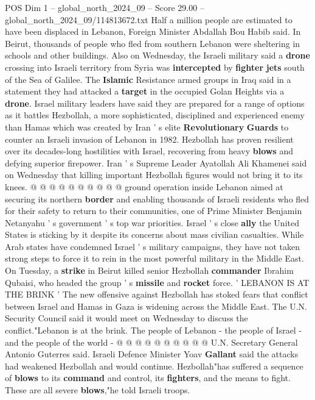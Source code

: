 \begin{textsample}{POS Dim 1 – global\_north\_2024\_09 – Score 29.00 – global\_north\_2024\_09/114813672.txt}
Half a million people are estimated to have been displaced in Lebanon, Foreign Minister Abdallah Bou Habib said.
In Beirut, thousands of people who fled from southern Lebanon were sheltering in schools and other buildings.
Also on Wednesday, the Israeli military said a \textbf{drone} crossing into Israeli territory from Syria was \textbf{intercepted} by \textbf{fighter} \textbf{jets} south of the Sea of Galilee.
The \textbf{Islamic} Resistance armed groups in Iraq said in a statement they had attacked a \textbf{target} in the occupied Golan Heights via a \textbf{drone}.
Israel military leaders have said they are prepared for a range of options as it battles Hezbollah, a more sophisticated, disciplined and experienced enemy than Hamas which was created by Iran ' s elite \textbf{Revolutionary} \textbf{Guards} to counter an Israeli invasion of Lebanon in 1982.
Hezbollah has proven resilient over its decades-long hostilities with Israel, recovering from heavy \textbf{blows} and defying superior firepower.
Iran ' s Supreme Leader Ayatollah Ali Khamenei said on Wednesday that killing important Hezbollah figures would not bring it to its knees. @ @ @ @ @ @ @ @ @ @ ground operation inside Lebanon aimed at securing its northern \textbf{border} and enabling thousands of Israeli residents who fled for their safety to return to their communities, one of Prime Minister Benjamin Netanyahu ' s government ' s top war priorities.
Israel ' s close \textbf{ally} the United States is sticking by it despite its concerns about mass civilian casualties.
While Arab states have condemned Israel ' s military campaigns, they have not taken strong steps to force it to rein in the most powerful military in the Middle East.
On Tuesday, a \textbf{strike} in Beirut killed senior Hezbollah \textbf{commander} Ibrahim Qubaisi, who headed the group ' s \textbf{missile} and \textbf{rocket} force. ' LEBANON IS AT THE BRINK ' The new offensive against Hezbollah has stoked fears that conflict between Israel and Hamas in Gaza is widening across the Middle East.
The U.N.
Security Council said it would meet on Wednesday to discuss the conflict."Lebanon is at the brink.
The people of Lebanon - the people of Israel - and the people of the world - @ @ @ @ @ @ @ @ @ @ U.N.
Secretary General Antonio Guterres said.
Israeli Defence Minister Yoav \textbf{Gallant} said the attacks had weakened Hezbollah and would continue.
Hezbollah"has suffered a sequence of \textbf{blows} to its \textbf{command} and control, its \textbf{fighters}, and the means to fight.
These are all severe \textbf{blows},"he told Israeli troops.

\end{textsample}
